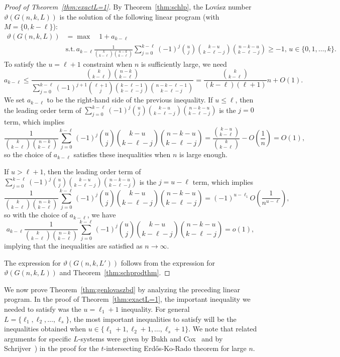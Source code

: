 \documentclass[11pt]{article}
\theoremstyle{definition}
\theoremstyle{remark}
\begin{document}
\begin{proof}[Proof of Theorem~\ref{thm:exactL=1}]
By Theorem~\ref{thm:schlp}, the Lov\'asz number $\vartheta(G(n, k, L))$ is the solution of the following linear program (with $M = \{0, k-\ell\}$):
\begin{equation}\label{eqn:L=1schlp}
\begin{aligned}
\vartheta(G(n, k, L)) &= \max \quad 1 +a_{k-\ell}\\
 & \text{s.t.}\, a_{k-\ell}\frac{1}{\binom{k}{k-\ell}\binom{n-k}{k-\ell}}\sum_{j=0}^{k-\ell}(-1)^j\binom{u}{j}\binom{k-u}{k-\ell-j}\binom{n-k-u}{k-\ell-j} \ge -1, \, u\in \{0, 1, \ldots, k\}.
\end{aligned}
\end{equation}
To satisfy the $u=\ell+1$ constraint when $n$ is sufficiently large, we need 
\[a_{k-\ell} \le \frac{\binom{k}{k-\ell}\binom{n-k}{k-\ell}}{\sum_{j=0}^{k-\ell}(-1)^{j+1}\binom{\ell+1}{j}\binom{k-\ell-1}{k-\ell-j}\binom{n-k-\ell-1}{k-\ell-j}} = \frac{\binom{k}{k-\ell}}{(k-\ell)(\ell+1)} n + O(1).\]
We set $a_{k-\ell}$ to be the right-hand side of the previous inequality. If $u \le \ell$, then the leading order term of $\sum_{j=0}^{k-\ell}(-1)^j\binom{u}{j}\binom{k-u}{k-\ell-j}\binom{n-k-u}{k-\ell-j}$ is the $j = 0$ term, which implies
\[ \frac{1}{\binom{k}{k-\ell}\binom{n-k}{k-\ell}}\sum_{j=0}^{k-\ell}(-1)^j\binom{u}{j}\binom{k-u}{k-\ell-j}\binom{n-k-u}{k-\ell-j} = \frac{\binom{k-u}{k-\ell}}{\binom{k}{k-\ell}} - O\left(\frac{1}{n}\right) =  O(1), \] so the choice of $a_{k-\ell}$ satisfies these inequalities when $n$ is large enough. 

If $u > \ell + 1$, then the leading order term of $\sum_{j=0}^{k-\ell}(-1)^j\binom{u}{j}\binom{k-u}{k-\ell-j}\binom{n-k-u}{k-\ell-j}$ is the $j = u-\ell$ term, which implies
\[ \frac{1}{\binom{k}{k-\ell}\binom{n-k}{k-\ell}}\sum_{j=0}^{k-\ell}(-1)^j\binom{u}{j}\binom{k-u}{k-\ell-j}\binom{n-k-u}{k-\ell-j} = (-1)^{u-\ell_1}O\left(\frac{1}{n^{u-\ell}}\right), \]
so with the choice of $a_{k-\ell}$, we have 
\[a_{k-\ell} \frac{1}{\binom{k}{k-\ell}\binom{n-k}{k-\ell}}\sum_{j=0}^{k-\ell}(-1)^j\binom{u}{j}\binom{k-u}{k-\ell-j}\binom{n-k-u}{k-\ell-j} = o(1),\]
implying that the inequalities are satisfied as $n\rightarrow \infty$. 

The expression for $\vartheta(G(n, k, L'))$ follows from the expression for $\vartheta(G(n, k, L))$ and  Theorem~\ref{thm:schprodthm}. 
\end{proof}

We now prove Theorem~\ref{thm:genlovaszbd} by analyzing the preceding linear program. In the proof of Theorem~\ref{thm:exactL=1}, the important inequality we needed to satisfy was the $u=\ell_1+1$ inequality. For general $L=\{\ell_1, \ell_2, \ldots, \ell_s\}$, the most important inequalities to satisfy will be the inequalities obtained when $u \in \{\ell_1+1, \ell_2+1, \ldots, \ell_s+1\}$. We note that related arguments for specific $L$-systems were given by Bukh and Cox~\cite[Lemma 12 (2)]{BuCo2019} and by Schrijver~\cite{Sch1978}) in the proof for the $t$-intersecting Erd\H{o}s-Ko-Rado theorem for large $n$. 
\end{document}
